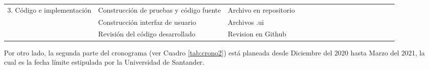 \begin{table}[H]
\begin{adjustbox}{width={\textwidth},totalheight={\textheight},keepaspectratio}
\begin{tabular}{cp{9.945em}p{9.945em}rrrrrrrrrrrrrr}
    \cline{1-3}\multicolumn{1}{c}{\multirow{3}[6]{*}{3. Código e implementación}} & Construcción de pruebas y código fuente & Archivo en repositorio &   &   &   &   &   & \cellcolor[rgb]{ .663,  .816,  .557} & \cellcolor[rgb]{ .663,  .816,  .557} & \cellcolor[rgb]{ .663,  .816,  .557} & \cellcolor[rgb]{ .663,  .816,  .557} & \cellcolor[rgb]{ .663,  .816,  .557} & \cellcolor[rgb]{ .663,  .816,  .557} & \cellcolor[rgb]{ .663,  .816,  .557} & \cellcolor[rgb]{ .663,  .816,  .557} & \cellcolor[rgb]{ .663,  .816,  .557} \bigstrut\\
    \cline{2-3}  & Construcción interfaz de usuario & Archivos .ui &   &   &   &   &   &   & \cellcolor[rgb]{ .886,  .937,  .855} & \cellcolor[rgb]{ .886,  .937,  .855} & \cellcolor[rgb]{ .886,  .937,  .855} & \cellcolor[rgb]{ .886,  .937,  .855} & \cellcolor[rgb]{ .886,  .937,  .855} & \cellcolor[rgb]{ .886,  .937,  .855} & \cellcolor[rgb]{ .886,  .937,  .855} & \cellcolor[rgb]{ .886,  .937,  .855} \bigstrut\\
    \cline{2-3}  & Revisión del código desarrollado & Revision en Github &   &   &   &   &   &   &   &   &   &   & \cellcolor[rgb]{ .663,  .816,  .557} & \cellcolor[rgb]{ .663,  .816,  .557} & \cellcolor[rgb]{ .663,  .816,  .557} & \cellcolor[rgb]{ .663,  .816,  .557} \bigstrut\\
    \hline
    \end{tabular}%
    \end{adjustbox}
    \label{tab:crono1}
\end{table}

Por otro lado, la segunda parte del cronograma (ver Cuadro \ref{tab:crono2}) está planeada desde Diciembre del 2020 hasta Marzo del 2021, la cual es la fecha límite estipulada por la Universidad de Santander.

